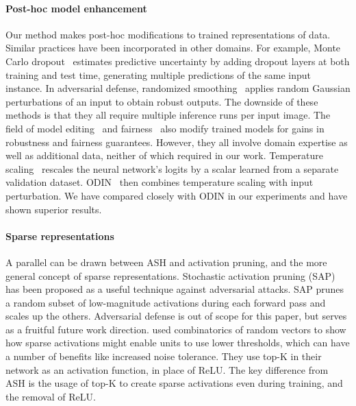 \documentclass{article}
\begin{document}
\paragraph{Post-hoc model enhancement} Our method makes post-hoc modifications to trained representations of data. Similar practices have been incorporated in other domains. For example, Monte Carlo dropout~\citep{gal2016dropout} estimates predictive uncertainty by adding dropout layers at both training and test time, generating multiple predictions of the same input instance. In adversarial defense, randomized smoothing~\citep{cohen2019certified} applies random Gaussian perturbations of an input to obtain robust outputs.
The downside of these methods is that they all require multiple inference runs per input image. The field of model editing~\citep{NEURIPS2021_c46489a2, Meng22GPT} and fairness~\citep{alabdulmohsin2021near, celis2019classification} also modify trained models for gains in robustness and fairness guarantees.
However, they all involve domain expertise as well as additional data, neither of which required in our work.
Temperature scaling~\citep{guo2017calibration} rescales the neural network's logits by a scalar learned from a separate validation dataset. ODIN~\citep{Liang2017} then combines temperature scaling with input perturbation. We have compared closely with ODIN in our experiments and have shown superior results.























\paragraph{Sparse representations}

A parallel can be drawn between ASH and activation pruning, and the more general concept of sparse representations. Stochastic activation pruning (SAP)~\citep{dhillon2018stochastic} has been proposed as a useful technique against adversarial attacks. SAP prunes a random subset of low-magnitude activations during each forward pass and scales up the others. 
Adversarial defense is out of scope for this paper, but serves as a fruitful future work direction.
\citet{ahmad2019can} used combinatorics of random vectors to show how sparse activations might enable units to use lower thresholds, which can have a number of benefits like increased noise tolerance. They use top-K in their network as an activation function, in place of ReLU. The key difference from ASH is the usage of top-K to create sparse activations even during training, and the removal of ReLU. 
\end{document}
